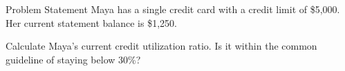 \begin{block}{Problem Statement}
  Maya has a single credit card with a credit limit of \$5,000. Her current statement balance is \$1,250.

  Calculate Maya's current credit utilization ratio. Is it within the common guideline of staying below 30\%?
\end{block}

\vspace{0.8em}
\centering
{}
